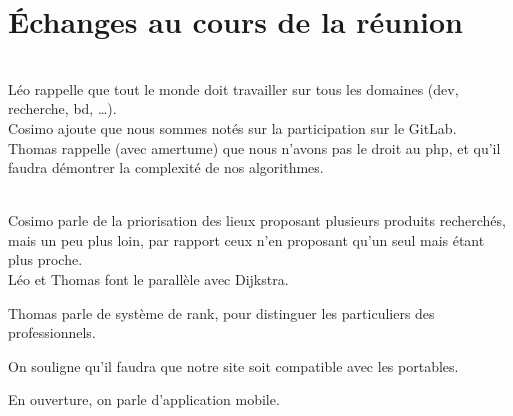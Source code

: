\section{Échanges au cours de la réunion}

    \begin{description}

        \vskip 0.5cm
        \item[Rappel des consignes de l'épreuve] \hfill\\
            Léo rappelle que tout le monde doit travailler sur tous les domaines (dev, recherche, bd, …).
            \\Cosimo ajoute que nous sommes notés sur la participation sur le GitLab.
            \\Thomas rappelle (avec amertume) que nous n’avons pas le droit au php, et qu’il faudra démontrer la complexité de nos algorithmes.
            
        \item[Les fonctionnalités de notre site] \hfill\\
            Cosimo parle de la priorisation des lieux proposant plusieurs produits recherchés, mais un peu plus loin, par rapport ceux n’en proposant qu’un seul mais étant plus proche.
            \\Léo et Thomas font le parallèle avec Dijkstra.

            Thomas parle de système de rank, pour distinguer les particuliers des professionnels.

            On souligne qu’il faudra que notre site soit compatible avec les portables.

            En ouverture, on parle d’application mobile.


    
    \end{description}
